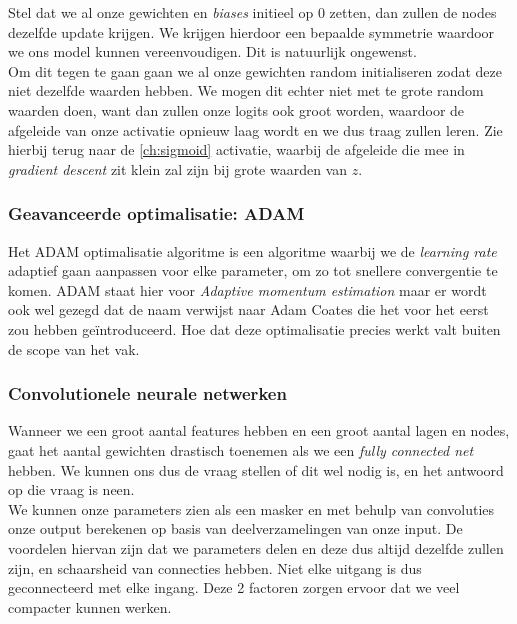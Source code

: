 Stel dat we al onze gewichten en \textit{biases} initieel op 0 zetten, dan zullen de nodes dezelfde update krijgen. We krijgen hierdoor een bepaalde symmetrie waardoor we ons model kunnen vereenvoudigen. Dit is natuurlijk ongewenst. \\
\newline
Om dit tegen te gaan gaan we al onze gewichten random initialiseren zodat deze niet dezelfde waarden hebben. We mogen dit echter niet met te grote random waarden doen, want dan zullen onze logits ook groot worden, waardoor de afgeleide van onze activatie opnieuw laag wordt en we dus traag zullen leren. Zie hierbij terug naar de \ref{ch:sigmoid} activatie, waarbij de afgeleide die mee in \textit{gradient descent} zit klein zal zijn bij grote waarden van $z$.

\subsubsection{Geavanceerde optimalisatie: ADAM}

Het ADAM optimalisatie algoritme is een algoritme waarbij we de \textit{learning rate} adaptief gaan aanpassen voor elke parameter, om zo tot snellere convergentie te komen. ADAM staat hier voor \textit{Adaptive momentum estimation} maar er wordt ook wel gezegd dat de naam verwijst naar Adam Coates die het voor het eerst zou hebben geïntroduceerd. Hoe dat deze optimalisatie precies werkt valt buiten de scope van het vak.

\subsubsection{Convolutionele neurale netwerken}

Wanneer we een groot aantal features hebben en een groot aantal lagen en nodes, gaat het aantal gewichten drastisch toenemen als we een \textit{fully connected net} hebben. We kunnen ons dus de vraag stellen of dit wel nodig is, en het antwoord op die vraag is neen. \\
\newline
We kunnen onze parameters zien als een masker en met behulp van convoluties onze output berekenen op basis van deelverzamelingen van onze input. De voordelen hiervan zijn dat we parameters delen en deze dus altijd dezelfde zullen zijn, en schaarsheid van connecties hebben. Niet elke uitgang is dus geconnecteerd met elke ingang. Deze 2 factoren zorgen ervoor dat we veel compacter kunnen werken. 
